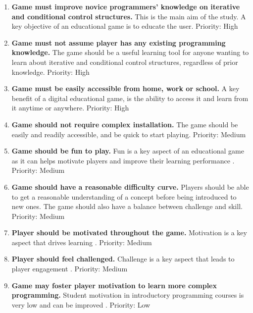 \documentclass[a4paper,11.5pt]{report}
\numberwithin{figure}{section}
\numberwithin{table}{section}
\numberwithin{equation}{section}
\numberwithin{equation}{section}
\begin{document}
\begin{enumerate}[label=3.1.\arabic*]

  \item \textbf{Game must improve novice programmers' knowledge on iterative and conditional control structures.} This is the main aim of the study. A key objective of an educational game is to educate the user. \newline Priority: High
  
  \item \textbf{Game must not assume player has any existing programming knowledge.} The game should be a useful learning tool for anyone wanting to learn about iterative and conditional control structures, regardless of prior knowledge. \newline Priority: High

  \item \textbf{Game must be easily accessible from home, work or school.} A key benefit of a digital educational game, is the ability to access it and learn from it anytime or anywhere. \newline Priority: High
  
  \item \textbf{Game should not require complex installation.} The game should be easily and readily accessible, and be quick to start playing. \newline Priority: Medium
  
  \item \textbf{Game should be fun to play.} Fun is a key aspect of an educational game as it can helps motivate players \citep{Cordova1996} and improve their learning performance \citep{giannakos2013}. \newline Priority: Medium
  
  \item \textbf{Game should have a reasonable difficulty curve.} Players should be able to get a reasonable understanding of a concept before being introduced to new ones. The game should also have a balance between challenge and skill. \newline Priority: Medium
  
  \item \textbf{Player should be motivated throughout the game.} Motivation is a key aspect that drives learning \citep{Gee2003}. \newline Priority: Medium
  
  \item \textbf{Player should feel challenged.} Challenge is a key aspect that leads to player engagement \citep{whitton2011}. \newline Priority: Medium
  
  \item \textbf{Game may foster player motivation to learn more complex programming.} Student motivation in introductory programming courses is very low and can be improved \citep{Koulouri2014}. \newline Priority: Low
  
\end{enumerate}
\end{document}
